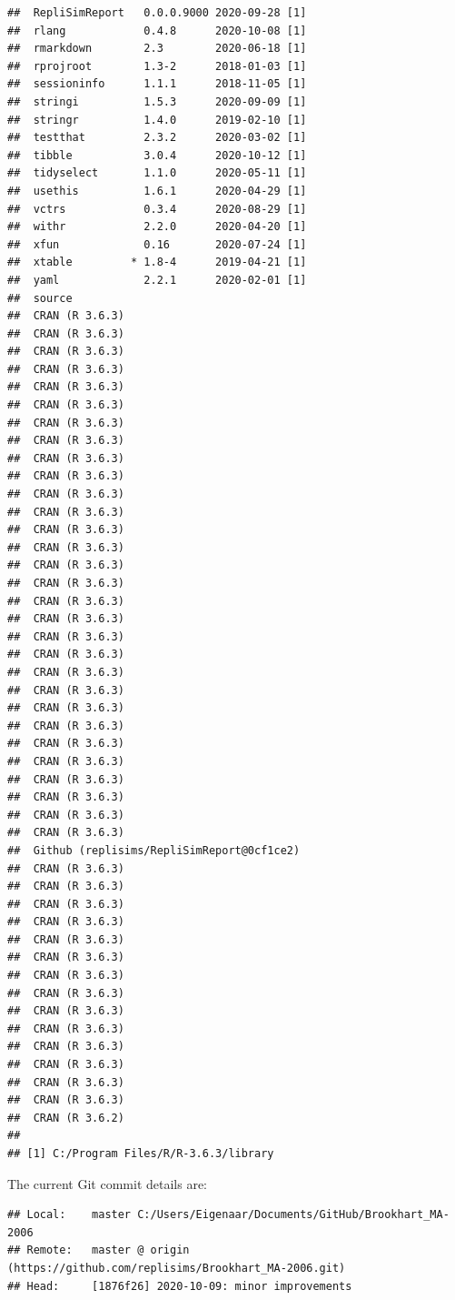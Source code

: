 \documentclass[10,a4paperpaper,]{article}
\begin{document}
\begin{verbatim}
##  RepliSimReport   0.0.0.9000 2020-09-28 [1]
##  rlang            0.4.8      2020-10-08 [1]
##  rmarkdown        2.3        2020-06-18 [1]
##  rprojroot        1.3-2      2018-01-03 [1]
##  sessioninfo      1.1.1      2018-11-05 [1]
##  stringi          1.5.3      2020-09-09 [1]
##  stringr          1.4.0      2019-02-10 [1]
##  testthat         2.3.2      2020-03-02 [1]
##  tibble           3.0.4      2020-10-12 [1]
##  tidyselect       1.1.0      2020-05-11 [1]
##  usethis          1.6.1      2020-04-29 [1]
##  vctrs            0.3.4      2020-08-29 [1]
##  withr            2.2.0      2020-04-20 [1]
##  xfun             0.16       2020-07-24 [1]
##  xtable         * 1.8-4      2019-04-21 [1]
##  yaml             2.2.1      2020-02-01 [1]
##  source                                   
##  CRAN (R 3.6.3)                           
##  CRAN (R 3.6.3)                           
##  CRAN (R 3.6.3)                           
##  CRAN (R 3.6.3)                           
##  CRAN (R 3.6.3)                           
##  CRAN (R 3.6.3)                           
##  CRAN (R 3.6.3)                           
##  CRAN (R 3.6.3)                           
##  CRAN (R 3.6.3)                           
##  CRAN (R 3.6.3)                           
##  CRAN (R 3.6.3)                           
##  CRAN (R 3.6.3)                           
##  CRAN (R 3.6.3)                           
##  CRAN (R 3.6.3)                           
##  CRAN (R 3.6.3)                           
##  CRAN (R 3.6.3)                           
##  CRAN (R 3.6.3)                           
##  CRAN (R 3.6.3)                           
##  CRAN (R 3.6.3)                           
##  CRAN (R 3.6.3)                           
##  CRAN (R 3.6.3)                           
##  CRAN (R 3.6.3)                           
##  CRAN (R 3.6.3)                           
##  CRAN (R 3.6.3)                           
##  CRAN (R 3.6.3)                           
##  CRAN (R 3.6.3)                           
##  CRAN (R 3.6.3)                           
##  CRAN (R 3.6.3)                           
##  CRAN (R 3.6.3)                           
##  CRAN (R 3.6.3)                           
##  Github (replisims/RepliSimReport@0cf1ce2)
##  CRAN (R 3.6.3)                           
##  CRAN (R 3.6.3)                           
##  CRAN (R 3.6.3)                           
##  CRAN (R 3.6.3)                           
##  CRAN (R 3.6.3)                           
##  CRAN (R 3.6.3)                           
##  CRAN (R 3.6.3)                           
##  CRAN (R 3.6.3)                           
##  CRAN (R 3.6.3)                           
##  CRAN (R 3.6.3)                           
##  CRAN (R 3.6.3)                           
##  CRAN (R 3.6.3)                           
##  CRAN (R 3.6.3)                           
##  CRAN (R 3.6.3)                           
##  CRAN (R 3.6.2)                           
## 
## [1] C:/Program Files/R/R-3.6.3/library
\end{verbatim}

The current Git commit details are:

\begin{verbatim}
## Local:    master C:/Users/Eigenaar/Documents/GitHub/Brookhart_MA-2006
## Remote:   master @ origin (https://github.com/replisims/Brookhart_MA-2006.git)
## Head:     [1876f26] 2020-10-09: minor improvements
\end{verbatim}
\end{document}
